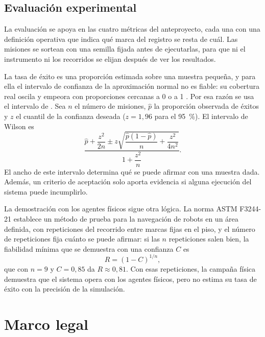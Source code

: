 \subsection{Evaluación experimental}
\label{sec:teo-evaluacion}

La evaluación se apoya en las cuatro métricas del anteproyecto, cada una con una definición operativa que indica
qué marca del registro se resta de cuál. Las misiones se sortean con una semilla fijada antes de ejecutarlas, para
que ni el instrumento ni los recorridos se elijan después de ver los resultados.

La tasa de éxito es una proporción estimada sobre una muestra pequeña, y para ella el intervalo de confianza de la aproximación normal no es fiable: su cobertura real oscila y empeora con proporciones cercanas a 0 o a 1 \autocite{brown2001interval}. Por esa razón se usa el intervalo de \textcite{wilson1927probable}. Sea $n$ el
número de misiones, $\hat{p}$ la proporción observada de éxitos y $z$ el cuantil
de la confianza deseada ($z = 1{,}96$ para el 95~\%). El intervalo de Wilson es
\begin{equation}
  \frac{\hat{p} + \dfrac{z^{2}}{2n} \pm z\sqrt{\dfrac{\hat{p}(1-\hat{p})}{n} + \dfrac{z^{2}}{4n^{2}}}}{1 + \dfrac{z^{2}}{n}} .
\end{equation}
El ancho de este intervalo determina qué se puede afirmar con una muestra dada. Además, un criterio de aceptación solo aporta evidencia si alguna ejecución del sistema puede incumplirlo.

La demostración con los agentes físicos sigue otra lógica. La norma ASTM F3244-21 \autocite{astm2021f3244} establece
un método de prueba para la navegación de robots en un área definida, con repeticiones del recorrido entre marcas
fijas en el piso, y el número de repeticiones fija cuánto se puede afirmar: si las $n$ repeticiones salen bien, la
fiabilidad mínima que se demuestra con una confianza $C$ es
\begin{equation}
  R = (1-C)^{1/n} ,
\end{equation}
que con $n = 9$ y $C = 0{,}85$ da $R \approx 0{,}81$. Con esas repeticiones, la campaña física demuestra que el
sistema opera con los agentes físicos, pero no estima su tasa de éxito con la precisión de la simulación.

\section{Marco legal}
\label{sec:legal}

